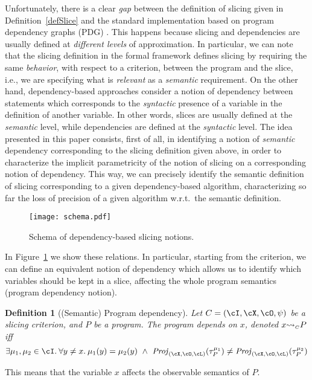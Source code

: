 \documentclass[prodmode,acmtocl]{acmsmall}
\def\prog{\ensuremath{P}\xspace}
\def\trace{\ensuremath{\tau}\xspace}
\def\memory{\ensuremath{\mu}\xspace}
\def\crit{\ensuremath{C}\xspace}
\def\Proj{\ensuremath{\mathit{Proj}}\xspace}
\newcommand{\0}{\mbox{\bf 0}}
\newtheorem{mydefinition}[theorem]{Definition}
\newcommand{\BINARYINFIXFUNCTION}[3]{\ifthenelse{\equal{#2}{}}{}{#2} #1 \ifthenelse{\equal{#3}{}}{}{#3}}
\newcommand{\CDEPENDS}[3]{\BINARYINFIXFUNCTION{{\rightsquigarrow}_{\mbox{\tiny\sc $#1$}}}{#2}{#3}}
\begin{document}
Unfortunately, there is a clear \emph{gap} between the definition of
slicing given in Definition~\ref{defSlice} and the standard
implementation based on program dependency graphs (PDG)
\cite{horPR89,reps91}.  This happens because slicing and dependencies
are usually defined at \emph{different levels} of approximation.  In
particular, we can note that the slicing definition in the formal
framework defines slicing by requiring the same \emph{behavior}, with
respect to a criterion, between the program and the slice, i.e., we
are specifying what is \emph{relevant} as a \emph{semantic}
requirement.  On the other hand, dependency-based approaches consider
a notion of dependency between statements which corresponds to the
\emph{syntactic} presence of a variable in the definition of another
variable.  In other words, slices are usually defined at the
\emph{semantic} level, while dependencies are defined at the
\emph{syntactic} level.  The idea presented in this paper consists,
first of all, in identifying a notion of \emph{semantic} dependency
corresponding to the slicing definition given above, in order to
characterize the implicit parametricity of the notion of slicing on a
corresponding notion of dependency.  This way, we can precisely
identify the semantic definition of slicing corresponding to a given
dependency-based algorithm, characterizing so far the loss of
precision of a given algorithm w.r.t.~the semantic definition.
\begin{figure}
  \begin{center}
    \texttt{[image: schema.pdf]}
  \end{center}
  \caption{Schema of dependency-based slicing notions.}\label{fig:schema}
\end{figure}
In Figure~\ref{fig:schema} we show these relations. In particular,
starting from the criterion, we can define an equivalent notion of
dependency which allows us to identify which variables should be kept
in a slice, affecting the whole program semantics (program dependency
notion).
\begin{mydefinition}[(Semantic) Program dependency]
Let $\crit=(\cI,\cX,\cO,\psi)$ be a slicing criterion, and $\prog$ be
a program. The program depends on $x$, denoted
$\CDEPENDS{\crit}{x}{\prog}$ iff
\[
\exists\memory_1,\memory_2\in\cI.\:\forall y\neq x.\:\memory_1(y)=\memory_2(y)\ \wedge\ 
\Proj_{(\cX, \cO, \cL)}(\trace_\prog^{\memory_1})\neq
\Proj_{(\cX, \cO, \cL)}(\trace_\prog^{\memory_2})
\]
\end{mydefinition}
This means that the variable $x$ affects the observable semantics of
$\prog$.
\end{document}
